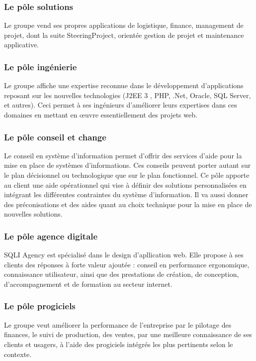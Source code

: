 \documentclass{report}
\begin{document}
\subsubsection{Le pôle solutions}
Le groupe vend ses propres applications de logistique, finance, management de projet, dont la suite
SteeringProject, orientée gestion de projet et maintenance applicative.

\subsubsection{Le pôle ingénierie}
Le groupe affiche une expertise reconnue dans le développement d’applications reposant sur les
nouvelles technologies (J2EE 3 , PHP, .Net, Oracle, SQL Server, et autres). Ceci permet à ses ingénieurs
d'améliorer leurs expertises dans ces domaines en mettant en œuvre essentiellement des projets web.

\subsubsection{Le pôle conseil et change}
Le conseil en système d’information permet d’offrir des services d'aide pour la mise en place de
systèmes d’informations. Ces conseils peuvent porter autant sur le plan décisionnel ou technologique
que sur le plan fonctionnel. Ce pôle apporte au client une aide opérationnel qui vise à définir des
solutions personnalisées en intégrant les différentes contraintes du système d’information. Il va aussi
donner des préconisations et des aides quant au choix technique pour la mise en place de nouvelles
solutions.

\subsubsection{Le pôle agence digitale}
SQLI Agency est spécialisé dans le design d'apllication web. Elle propose à ses clients des réponses à forte valeur ajoutée : conseil en performance ergonomique, connaissance utilisateur, ainsi que des prestations de création, de conception, d’accompagnement et de formation au secteur internet.

\subsubsection{ Le pôle progiciels}
Le groupe veut améliorer la performance de l’entreprise par le pilotage des finances, le suivi de
production, des ventes, par une meilleure connaissance de ses clients et usagers, à l’aide des
progiciels intégrés les plus pertinents selon le contexte.
\end{document}
